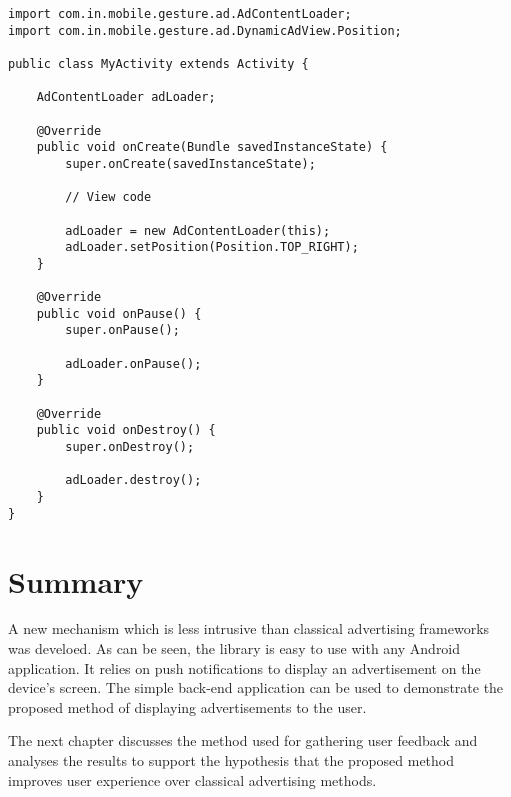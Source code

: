 \begin{lstlisting}
import com.in.mobile.gesture.ad.AdContentLoader;
import com.in.mobile.gesture.ad.DynamicAdView.Position;

public class MyActivity extends Activity {

    AdContentLoader adLoader;

    @Override
    public void onCreate(Bundle savedInstanceState) {
        super.onCreate(savedInstanceState);

        // View code

        adLoader = new AdContentLoader(this);
        adLoader.setPosition(Position.TOP_RIGHT);
    }

    @Override
    public void onPause() {
        super.onPause();

        adLoader.onPause();
    }

    @Override
    public void onDestroy() {
        super.onDestroy();

        adLoader.destroy();
    }
}
\end{lstlisting}

\section{Summary}

A new mechanism which is less intrusive than classical advertising frameworks was develoed. As can be seen, the library is easy to use with any Android application. It relies on push notifications to display an advertisement on the device's screen. The simple back-end application can be used to demonstrate the proposed method of displaying advertisements to the user.

The next chapter discusses the method used for gathering user feedback and analyses the results to support the hypothesis that the proposed method improves user experience over classical advertising methods.